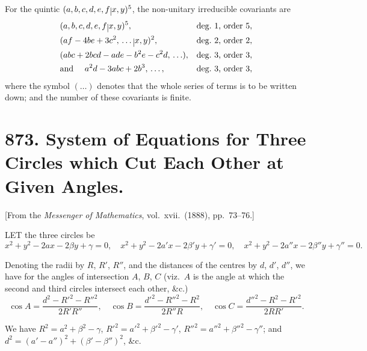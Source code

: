 \documentclass[11pt,a4paper]{book}
\begin{document}
\medskip\noindent
For the quintic $(a, b, c, d, e, f\,\raisebox{-.5ex}{$\hspace{-.2em}\vert\hspace{-.2em}$}\,x, y)^{5}$, the non-unitary irreducible covariants are
\begin{align*}
&(a, b, c, d, e, f\,\raisebox{-.5ex}{$\hspace{-.2em}\vert\hspace{-.2em}$}\,x, y)^{5}, && \text{deg.\ 1, order 5}, \\
&(af - 4be + 3c^{2},\,\ldots\,\raisebox{-.5ex}{$\hspace{-.2em}\vert\hspace{-.2em}$}\,x, y)^{2}, && \text{deg.\ 2, order 2}, \\
&(abc + 2bcd - ade - b^{2}e - c^{2}d,\,\ldots), && \text{deg.\ 3, order 3}, \\
&\text{and } \quad a^{2}d - 3abc + 2b^{3},\,\ldots, && \text{deg.\ 3, order 3},
\end{align*}
where the symbol $(\ldots)$ denotes that the whole series of terms is to be written down; and the number of these covariants is finite.

\newpage
\section[873]{873. System of Equations for Three Circles which Cut Each Other at Given Angles.}
\label{sec:873}

[From the \textit{Messenger of Mathematics}, vol.\ xvii.\ (1888), pp.\ 73--76.]

\medskip\noindent
LET the three circles be
\[
x^{2} + y^{2} - 2ax - 2\beta y + \gamma = 0, \quad
x^{2} + y^{2} - 2a'x - 2\beta' y + \gamma' = 0, \quad
x^{2} + y^{2} - 2a''x - 2\beta'' y + \gamma'' = 0.
\]

Denoting the radii by $R$, $R'$, $R''$, and the distances of the centres by $d$, $d'$, $d''$, we have for the angles of intersection $A$, $B$, $C$ (viz.\ $A$ is the angle at which the second and third circles intersect each other, \&c.)
\[
\cos A = \frac{d^{2} - R'^{2} - R''^{2}}{2R'R''}, \quad
\cos B = \frac{d'^{2} - R''^{2} - R^{2}}{2R''R}, \quad
\cos C = \frac{d''^{2} - R^{2} - R'^{2}}{2RR'}.
\]

We have $R^{2} = a^{2} + \beta^{2} - \gamma$, $R'^{2} = a'^{2} + \beta'^{2} - \gamma'$, $R''^{2} = a''^{2} + \beta''^{2} - \gamma''$; and $d^{2} = (a' - a'')^{2} + (\beta' - \beta'')^{2}$, \&c.
\end{document}
